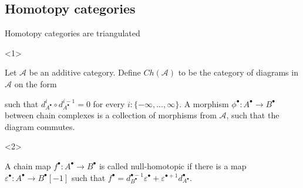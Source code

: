 \documentclass{beamer}
\newcommand{\chain}[1]{#1^{\bullet}}
\begin{document}
        \subsection{Homotopy categories}
            \begin{frame}{Homotopy categories are triangulated}
                \begin{onlyenv}<1>
                    \begin{definition}
                        Let $\mathcal{A}$ be an additive category. Define $Ch(\mathcal{A})$ to be the category of diagrams in $\mathcal{A}$ on the form
                        \begin{center}
                        \end{center}
                        such that $d^i_{\chain{A}}\circ d^{i-1}_{\chain{A}}=0$ for every $i:\{-\infty,...,\infty\}$. A morphism $\chain{\phi} : \chain{A}\rightarrow \chain{B}$ between chain complexes is a collection of morphisms from $\mathcal{A}$, such that the diagram commutes.
                        \begin{center}
                        \end{center}
                    \end{definition}
                \end{onlyenv}
                \begin{onlyenv}<2>
                    \begin{definition}[Homotopies]
                        A chain map $f^{\bullet}:A^{\bullet}\rightarrow B^{\bullet}$ is called null-homotopic if there is a map $\varepsilon^{\bullet}:A^{\bullet}\rightarrow B^{\bullet}[-1]$ such that $f^{\bullet} = d_{B^{\bullet}}^{\bullet - 1}\varepsilon^{\bullet} + \varepsilon^{\bullet + 1}d_{A^{\bullet}}^{\bullet}$.

\end{definition}
\end{onlyenv}
\end{frame}
\end{document}
